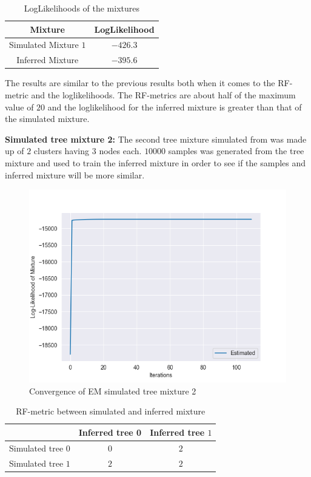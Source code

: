 \begin{table}[H]

  \centering
  \begin{tabular}{ | c | c |}
  \hline
  Mixture & LogLikelihood \\ \hline
  Simulated Mixture $1$ & $-426.3$\\ \hline
  Inferred Mixture & $-395.6$\\ \hline
  \end{tabular}
  \caption{LogLikelihoods of the mixtures}
  \label{Likelihood_simulated_1}
\end{table}

The results are similar to the previous results both when it comes to the RF-metric and the loglikelihoods. The RF-metrics are about half of the maximum value of $20$ and the loglikelihood for the inferred mixture is greater than that of the simulated mixture.


\textbf{Simulated tree mixture 2:}
The second tree mixture simulated from was made up of $2$ clusters having $3$ nodes each. $10000$ samples was generated from the tree mixture and used to train the inferred mixture in order to see if the samples and inferred mixture will be more similar.

\begin{figure}[H]
  \centering
  \includegraphics[width = \linewidth]{em_likelihoods_simulated_2.png}
  \caption{Convergence of EM simulated tree mixture 2}
  \label{EM_convergence_simulated_2}
\end{figure}

\begin{table}

  \centering
  \begin{tabular}{ | c | c | c |}
  \hline
   & Inferred tree 0 & Inferred tree $1$ \\ \hline
  Simulated tree $0$ & $0$ & $2$ \\ \hline
  Simulated tree $1$ & $2$ & $2$ \\ \hline

  \end{tabular}
  \caption{RF-metric between simulated and inferred mixture}
  \label{RF-metric_simulated_2_inferred}
\end{table}

